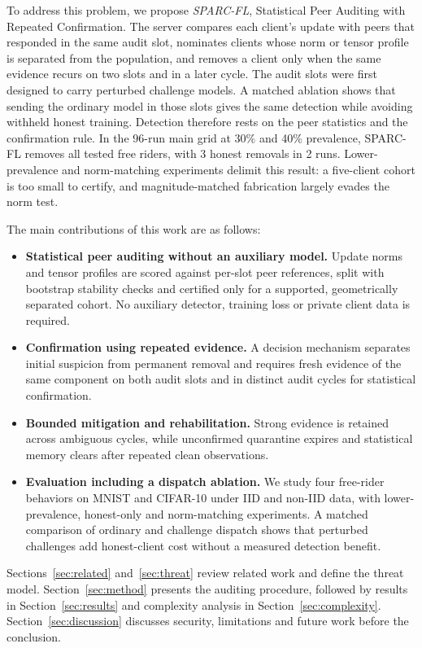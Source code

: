 \documentclass[journal]{IEEEtran}
\begin{document}
To address this problem, we propose \emph{SPARC-FL}, Statistical Peer
Auditing with Repeated Confirmation. The server compares each client's
update with peers that responded in the same audit slot, nominates clients
whose norm or tensor profile is separated from the population, and removes
a client only when the same evidence recurs on two slots and in a later
cycle. The audit slots were first designed to carry perturbed challenge
models. A matched ablation shows that sending the ordinary model in those
slots gives the same detection while avoiding withheld honest training.
Detection therefore rests on the peer statistics and the confirmation rule.
In the 96-run main grid at 30\% and 40\% prevalence,
SPARC-FL removes all tested free riders, with 3 honest removals
in 2 runs. Lower-prevalence and norm-matching
experiments delimit this result: a five-client cohort is too small to
certify, and magnitude-matched fabrication largely evades the norm test.

\noindent The main contributions of this work are as follows:
\begin{itemize} %
\item \textbf{Statistical peer auditing without an auxiliary model.} Update
norms and tensor profiles are scored against per-slot peer references,
split with bootstrap stability checks and certified only for a supported,
geometrically separated cohort. No auxiliary detector, training loss or
private client data is required.
\item \textbf{Confirmation using repeated evidence.} A decision mechanism
separates initial suspicion from permanent removal and requires fresh
evidence of the same component on both audit slots and in distinct audit
cycles for statistical confirmation.
\item \textbf{Bounded mitigation and rehabilitation.} Strong evidence is
retained across ambiguous cycles, while unconfirmed quarantine expires and
statistical memory clears after repeated clean observations.
\item \textbf{Evaluation including a dispatch ablation.} We study four
free-rider behaviors on MNIST and CIFAR-10 under IID and non-IID data, with
lower-prevalence, honest-only and norm-matching experiments. A matched
comparison of ordinary and challenge dispatch shows that perturbed
challenges add honest-client cost without a measured detection benefit.
\end{itemize}

Sections~\ref{sec:related} and~\ref{sec:threat} review related work and
define the threat model. Section~\ref{sec:method} presents the auditing
procedure, followed by results in Section~\ref{sec:results} and complexity
analysis in Section~\ref{sec:complexity}. Section~\ref{sec:discussion}
discusses security, limitations and future work before the conclusion.
\end{document}
